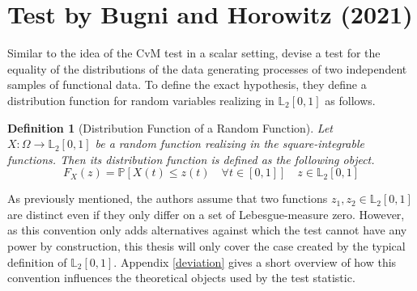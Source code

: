 \documentclass[12pt, a4paper]{article}
\theoremstyle{MAstyle} \newtheorem{assumption}{Assumption}[section]
\theoremstyle{MAstyle} \newtheorem{definition}{Definition}[section]
\theoremstyle{MAstyle} \newtheorem{theorem}{Theorem}[section]
\begin{document}
	\section{Test by Bugni and Horowitz (2021)}\label{Bugni_Horowitz_2021}
	
		Similar to the idea of the CvM test in a scalar setting, \cite{bugni_permutation_2021} devise a test for the equality of the distributions of the data generating processes of two independent samples of functional data. 
		To define the exact hypothesis, they define a distribution function for random variables realizing in $\mathbb{L}_2[0,1]$ as follows.
		\begin{definition}[Distribution Function of a Random Function]\label{dist_func}
			Let $X:\Omega \rightarrow \mathbb{L}_2[0,1]$ be a random function realizing in the square-integrable functions. Then its distribution function is defined as the following object.
			\begin{equation*}
				F_X(z) = \mathbb{P}\left[X(t) \leq z(t) \quad \forall t \in [0,1]\right] \quad z \in \mathbb{L}_2[0,1]
			\end{equation*}
		\end{definition}
		As previously mentioned, the authors assume that two functions $z_1, z_2 \in \mathbb{L}_2[0,1]$ are distinct even if they only differ on a set of Lebesgue-measure zero. However, as this convention only adds alternatives against which the test cannot have any power by construction, this thesis will only cover the case created by the typical definition of $\mathbb{L}_2[0,1]$. Appendix \ref{deviation} gives a short overview of how this convention influences the theoretical objects used by the test statistic.
		
		\newpage
\end{document}

